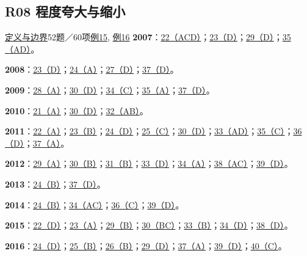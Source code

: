 \documentclass[11pt,a4paper]{article}
\begin{document}
\subsection{R08 程度夸大与缩小}\label{class-R08}
\noindent \hyperref[cat-R08]{定义与边界}\quad 52题／60项\quad \hyperref[case-2007-T3-Q35]{例15}, \hyperref[case-2015-T3-Q34]{例16}
\noindent\textbf{2007}：\hyperref[idx-2007-T1-Q22]{22（ACD）}；\hyperref[idx-2007-T1-Q23]{23（D）}；\hyperref[idx-2007-T2-Q29]{29（D）}；\hyperref[idx-2007-T3-Q35]{35（AD）}。\par
\noindent\textbf{2008}：\hyperref[idx-2008-T1-Q23]{23（D）}；\hyperref[idx-2008-T1-Q24]{24（A）}；\hyperref[idx-2008-T2-Q27]{27（D）}；\hyperref[idx-2008-T4-Q37]{37（D）}。\par
\noindent\textbf{2009}：\hyperref[idx-2009-T2-Q28]{28（A）}；\hyperref[idx-2009-T2-Q30]{30（D）}；\hyperref[idx-2009-T3-Q34]{34（C）}；\hyperref[idx-2009-T3-Q35]{35（A）}；\hyperref[idx-2009-T4-Q37]{37（D）}。\par
\noindent\textbf{2010}：\hyperref[idx-2010-T1-Q21]{21（A）}；\hyperref[idx-2010-T2-Q30]{30（D）}；\hyperref[idx-2010-T3-Q32]{32（AB）}。\par
\noindent\textbf{2011}：\hyperref[idx-2011-T1-Q22]{22（A）}；\hyperref[idx-2011-T1-Q23]{23（B）}；\hyperref[idx-2011-T1-Q24]{24（D）}；\hyperref[idx-2011-T1-Q25]{25（C）}；\hyperref[idx-2011-T2-Q30]{30（D）}；\hyperref[idx-2011-T3-Q33]{33（AD）}；\hyperref[idx-2011-T3-Q35]{35（C）}；\hyperref[idx-2011-T4-Q36]{36（D）}；\hyperref[idx-2011-T4-Q37]{37（A）}。\par
\noindent\textbf{2012}：\hyperref[idx-2012-T2-Q29]{29（A）}；\hyperref[idx-2012-T2-Q30]{30（B）}；\hyperref[idx-2012-T3-Q31]{31（B）}；\hyperref[idx-2012-T3-Q33]{33（D）}；\hyperref[idx-2012-T3-Q34]{34（A）}；\hyperref[idx-2012-T4-Q38]{38（AC）}；\hyperref[idx-2012-T4-Q39]{39（D）}。\par
\noindent\textbf{2013}：\hyperref[idx-2013-T1-Q24]{24（B）}；\hyperref[idx-2013-T4-Q37]{37（D）}。\par
\noindent\textbf{2014}：\hyperref[idx-2014-T1-Q24]{24（B）}；\hyperref[idx-2014-T3-Q34]{34（AC）}；\hyperref[idx-2014-T4-Q36]{36（C）}；\hyperref[idx-2014-T4-Q39]{39（D）}。\par
\noindent\textbf{2015}：\hyperref[idx-2015-T1-Q22]{22（D）}；\hyperref[idx-2015-T1-Q23]{23（A）}；\hyperref[idx-2015-T2-Q29]{29（B）}；\hyperref[idx-2015-T2-Q30]{30（BC）}；\hyperref[idx-2015-T3-Q33]{33（B）}；\hyperref[idx-2015-T3-Q34]{34（D）}；\hyperref[idx-2015-T4-Q38]{38（D）}。\par
\noindent\textbf{2016}：\hyperref[idx-2016-T1-Q24]{24（D）}；\hyperref[idx-2016-T1-Q25]{25（B）}；\hyperref[idx-2016-T2-Q26]{26（B）}；\hyperref[idx-2016-T2-Q29]{29（D）}；\hyperref[idx-2016-T4-Q37]{37（A）}；\hyperref[idx-2016-T4-Q39]{39（D）}；\hyperref[idx-2016-T4-Q40]{40（C）}。\par
{}
\end{document}
